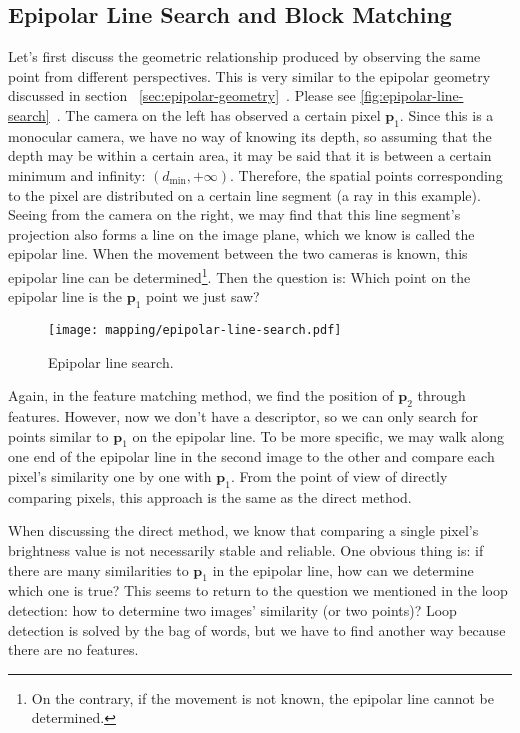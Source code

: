 \subsection{Epipolar Line Search and Block Matching}
Let's first discuss the geometric relationship produced by observing the same point from different perspectives. This is very similar to the epipolar geometry discussed in section ~\ref{sec:epipolar-geometry}~. Please see \autoref{fig:epipolar-line-search}~. The camera on the left has observed a certain pixel $\mathbf{p}_1$. Since this is a monocular camera, we have no way of knowing its depth, so assuming that the depth may be within a certain area, it may be said that it is between a certain minimum and infinity: $(d_\mathrm{min}, +\infty)$. Therefore, the spatial points corresponding to the pixel are distributed on a certain line segment (a ray in this example). Seeing from the camera on the right, we may find that this line segment's projection also forms a line on the image plane, which we know is called the epipolar line. When the movement between the two cameras is known, this epipolar line can be determined\footnote{On the contrary, if the movement is not known, the epipolar line cannot be determined. }. Then the question is: Which point on the epipolar line is the $\mathbf{p}_1$ point we just saw?

\begin{figure}[!htp]
	\centering
	\texttt{[image: mapping/epipolar-line-search.pdf]}
	\caption{Epipolar line search.}
	\label{fig:epipolar-line-search}
\end{figure}

Again, in the feature matching method, we find the position of $\mathbf{p}_2$ through features. However, now we don't have a descriptor, so we can only search for points similar to $\mathbf{p}_1$ on the epipolar line. To be more specific, we may walk along one end of the epipolar line in the second image to the other and compare each pixel's similarity one by one with $\mathbf{p}_1$. From the point of view of directly comparing pixels, this approach is the same as the direct method.

When discussing the direct method, we know that comparing a single pixel's brightness value is not necessarily stable and reliable. One obvious thing is: if there are many similarities to $\mathbf{p}_1$ in the epipolar line, how can we determine which one is true? This seems to return to the question we mentioned in the loop detection: how to determine two images' similarity (or two points)? Loop detection is solved by the bag of words, but we have to find another way because there are no features.

